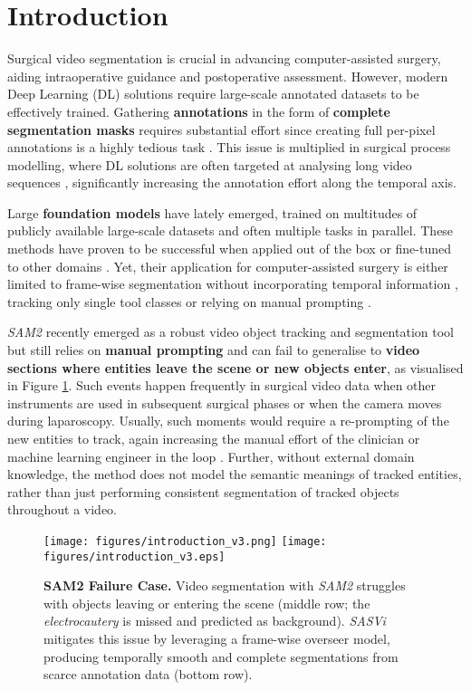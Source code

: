 \section{Introduction}
\label{sec:intro}

Surgical video segmentation is crucial in advancing computer-assisted surgery, aiding intraoperative guidance and postoperative assessment. However, modern Deep Learning (DL) solutions require large-scale annotated datasets to be effectively trained. Gathering \textbf{annotations} in the form of \textbf{complete segmentation masks} requires substantial effort since creating full per-pixel annotations is a highly tedious task \cite{sanner2024detection}. This issue is multiplied in surgical process modelling, where DL solutions are often targeted at analysing long video sequences \cite{al2019cataracts,twinanda2016endonet}, significantly increasing the annotation effort along the temporal axis.

Large \textbf{foundation models} have lately emerged, trained on multitudes of publicly available large-scale datasets and often multiple tasks in parallel. These methods have proven to be successful when applied out of the box or fine-tuned to other domains \cite{ma2024segment,yu2024sam,chen2024sam2}. Yet, their application for computer-assisted surgery is either limited to frame-wise segmentation without incorporating temporal information \cite{sheng2024surgical,yue2024surgicalsam,chen2024sam2}, tracking only single tool classes \cite{wu2024real,liu2024surgical} or relying on manual prompting \cite{lou2024zero,yu2024sam}. 

\emph{SAM2} \cite{ravi2024sam} recently emerged as a robust video object tracking and segmentation tool but still relies on \textbf{manual prompting} and can fail to generalise to \textbf{video sections where entities leave the scene or new objects enter}, as visualised in Figure \ref{fig:intro}. Such events happen frequently in surgical video data when other instruments are used in subsequent surgical phases or when the camera moves during laparoscopy. Usually, such moments would require a re-prompting of the new entities to track, again increasing the manual effort of the clinician or machine learning engineer in the loop \cite{wang2023sam}. Further, without external domain knowledge, the method does not model the semantic meanings of tracked entities, rather than just performing consistent segmentation of tracked objects throughout a video.

\begin{figure}[htbp]
    \centering
    \if{}
        \texttt{[image: figures/introduction\_v3.png]}
    \else
        \texttt{[image: figures/introduction\_v3.eps]}
    \fi
    \caption{\textbf{SAM2 Failure Case.} Video segmentation with \emph{SAM2} struggles with objects leaving or entering the scene (middle row; the \emph{electrocautery} is missed and predicted as background). \emph{SASVi} mitigates this issue by leveraging a frame-wise overseer model, producing temporally smooth and complete segmentations from scarce annotation data (bottom row).}
    \label{fig:intro}
\end{figure}

